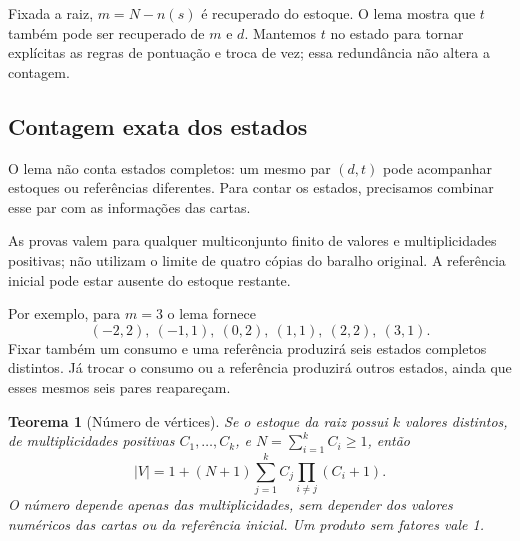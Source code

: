 \documentclass[11pt,a4paper]{article}
\newtheorem{teorema}[proposicao]{Teorema}
\theoremstyle{definition}
\newcommand{\proxpagina}{\newpage}
\begin{document}
Fixada a raiz, $m=N-n(s)$ é recuperado do estoque. O lema mostra que $t$ também pode ser recuperado de $m$ e $d$. Mantemos $t$ no estado para tornar explícitas as regras de pontuação e troca de vez; essa redundância não altera a contagem.

\proxpagina
\subsection{Contagem exata dos estados}
O lema não conta estados completos: um mesmo par $(d,t)$ pode acompanhar estoques ou referências diferentes. Para contar os estados, precisamos combinar esse par com as informações das cartas.

As provas valem para qualquer multiconjunto finito de valores e multiplicidades positivas; não utilizam o limite de quatro cópias do baralho original. A referência inicial pode estar ausente do estoque restante.

Por exemplo, para $m=3$ o lema fornece
\[
(-2,2),\ (-1,1),\ (0,2),\ (1,1),\ (2,2),\ (3,1).
\]
Fixar também um consumo e uma referência produzirá seis estados completos distintos. Já trocar o consumo ou a referência produzirá outros estados, ainda que esses mesmos seis pares reapareçam.

\begin{teorema}[Número de vértices]\label{teo:vertices}
Se o estoque da raiz possui $k$ valores distintos, de multiplicidades positivas $C_1,\ldots,C_k$, e $N=\sum_{i=1}^{k}C_i\ge1$, então
\begin{equation}\label{eq:vertices}
\boxed{\displaystyle |V|=1+(N+1)\sum_{j=1}^{k} C_j\prod_{i\ne j}(C_i+1).}
\end{equation}
O número depende apenas das multiplicidades, sem depender dos valores numéricos das cartas ou da referência inicial. Um produto sem fatores vale 1.
\end{teorema}
\end{document}
